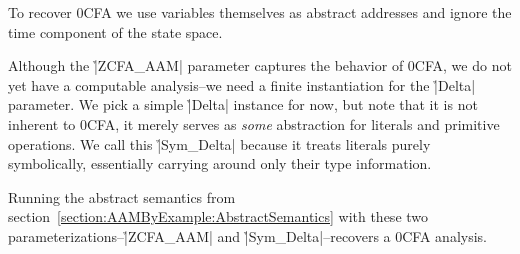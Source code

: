 To recover 0CFA we use variables themselves as abstract addresses and ignore
the time component of the state space.
%


Although the \h|ZCFA_AAM| parameter captures the behavior of 0CFA, we do not
yet have a computable analysis--we need a finite instantiation for the
\h|Delta| parameter.
%
We pick a simple \h|Delta| instance for now, but note that it is not inherent
to 0CFA, it merely serves as \textit{some} abstraction for literals and
primitive operations.
%
%
We call this \h|Sym_Delta| because it treats literals purely symbolically,
essentially carrying around only their type information.


Running the abstract semantics from
section~\ref{section:AAMByExample:AbstractSemantics} with these two
parameterizations--\h|ZCFA_AAM| and \h|Sym_Delta|--recovers a 0CFA analysis.
%
